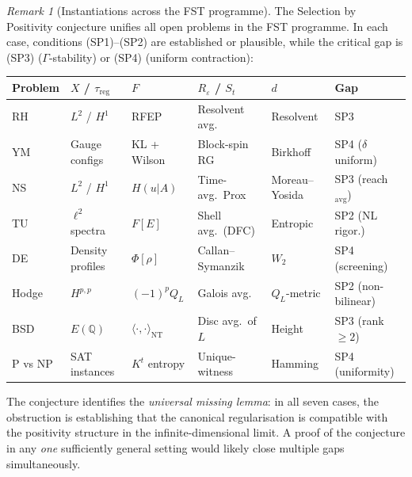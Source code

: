 \documentclass[12pt,a4paper]{article}
\theoremstyle{definition}
\theoremstyle{remark}
\newtheorem{remark}[theorem]{Remark}
\begin{document}
\begin{remark}[Instantiations across the FST programme]
\label{rem:selection-instantiations}
The Selection by Positivity conjecture unifies all open problems in the FST programme. In each case, conditions \textup{(SP1)--(SP2)} are established or plausible, while the critical gap is \textup{(SP3)} ($\Gamma$-stability) or \textup{(SP4)} (uniform contraction):

\begin{center}
\small
\begin{tabular}{l|l|l|l|l|l}
\textbf{Problem} & $X$ / $\tau_{\mathrm{reg}}$ & $F$ & $R_\varepsilon$ / $S_t$ & $d$ & \textbf{Gap} \\
\hline
RH & $L^2$ / $H^1$ & RFEP & Resolvent avg. & Resolvent & SP3 \\
YM & Gauge configs & KL + Wilson & Block-spin RG & Birkhoff & SP4 ($\delta$ uniform) \\
NS & $L^2$ / $H^1$ & $H(u|A)$ & Time-avg.\ Prox & Moreau--Yosida & SP3 (reach$_{\mathrm{avg}}$) \\
TU & $\ell^2$ spectra & $F[E]$ & Shell avg.\ (DFC) & Entropic & SP2 (NL rigor.) \\
DE & Density profiles & $\Phi[\rho]$ & Callan--Symanzik & $W_2$ & SP4 (screening) \\
Hodge & $H^{p,p}$ & $(-1)^p Q_L$ & Galois avg. & $Q_L$-metric & SP2 (non-bilinear) \\
BSD & $E(\mathbb{Q})$ & $\langle\cdot,\cdot\rangle_{\mathrm{NT}}$ & Disc avg.\ of $L$ & Height & SP3 (rank $\geq 2$) \\
P vs NP & SAT instances & $K^t$ entropy & Unique-witness & Hamming & SP4 (uniformity) \\
\end{tabular}
\end{center}

\noindent
The conjecture identifies the \emph{universal missing lemma}: in all seven cases, the obstruction is establishing that the canonical regularisation is compatible with the positivity structure in the infinite-dimensional limit. A proof of the conjecture in any \emph{one} sufficiently general setting would likely close multiple gaps simultaneously.
\end{remark}
\end{document}
